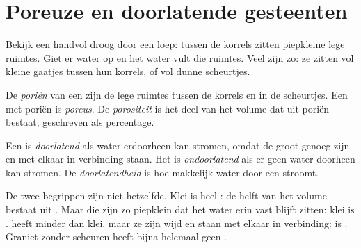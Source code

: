 \section{Poreuze en doorlatende gesteenten}

Bekijk een handvol droog  door een loep: tussen de korrels zitten
piepkleine lege ruimtes. Giet er water op en het water vult die ruimtes.
Veel  zijn zo: ze zitten vol kleine gaatjes tussen hun korrels,
of vol dunne scheurtjes.

\begin{definition}[Porositeit]\label{def:g6:water-underground:porosity}
De \emph{poriën} van een  zijn de lege ruimtes
tussen de korrels en in de scheurtjes. Een  met poriën is
\emph{poreus}. De \emph{porositeit} is het
deel van het volume dat uit poriën bestaat, geschreven als percentage.
\end{definition}

\begin{definition}[Doorlatendheid]\label{def:g6:water-underground:permeability}
Een  is \emph{doorlatend} als water erdoorheen
kan stromen, omdat de  groot genoeg zijn en met elkaar in verbinding
staan. Het is \emph{ondoorlatend} als er geen water
doorheen kan stromen. De \emph{doorlatendheid} is hoe
makkelijk water door een  stroomt.
\end{definition}

De twee begrippen zijn niet hetzelfde. Klei is heel : de helft van
het volume bestaat uit . Maar die  zijn zo piepklein dat het
water erin vast blijft zitten: klei is \emph{}.  heeft
minder  dan klei, maar ze zijn wijd en staan met elkaar in
verbinding:  is \emph{}. Graniet zonder scheuren heeft bijna
helemaal geen .

